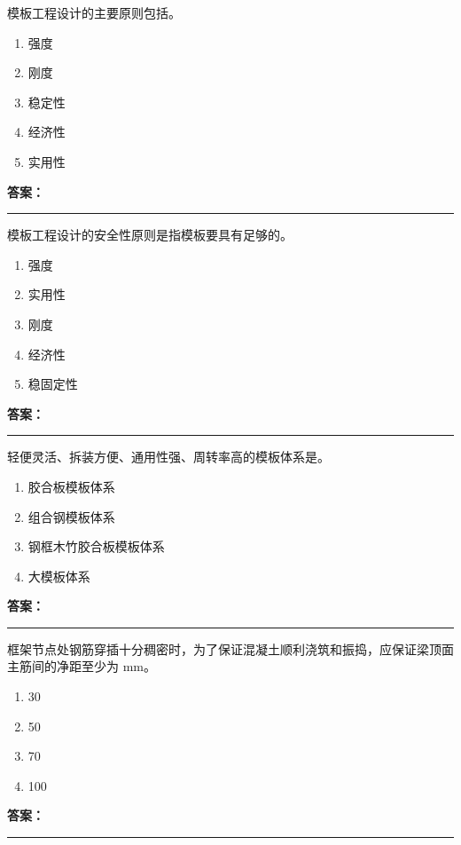 \documentclass[UTF8,fontset=fandol,11pt]{ctexart}
\newcommand{\answerline}{\textcolor{answerred}{\rule{2.4cm}{0.7pt}}}
\begin{document}
\vspace{0.2em}

\begin{quizbox}[title={第 22 题}]
模板工程设计的主要原则包括。\\
\begin{enumerate}[label=\Alph*.]
\item 强度
\item 刚度
\item 稳定性
\item 经济性
\item 实用性
\end{enumerate}
\textbf{\textcolor{answerred}{答案：}} \answerline
\end{quizbox}

\vspace{0.2em}

\begin{quizbox}[title={第 23 题}]
模板工程设计的安全性原则是指模板要具有足够的。\\
\begin{enumerate}[label=\Alph*.]
\item 强度
\item 实用性
\item 刚度
\item 经济性
\item 稳固定性
\end{enumerate}
\textbf{\textcolor{answerred}{答案：}} \answerline
\end{quizbox}

\vspace{0.2em}

\begin{quizbox}[title={第 24 题}]
轻便灵活、拆装方便、通用性强、周转率高的模板体系是。\\
\begin{enumerate}[label=\Alph*.]
\item 胶合板模板体系
\item 组合钢模板体系
\item 钢框木竹胶合板模板体系
\item 大模板体系
\end{enumerate}
\textbf{\textcolor{answerred}{答案：}} \answerline
\end{quizbox}

\vspace{0.2em}

\begin{quizbox}[title={第 25 题}]
框架节点处钢筋穿插十分稠密时，为了保证混凝土顺利浇筑和振捣，应保证梁顶面主筋间的净距至少为 mm。\\
\begin{enumerate}[label=\Alph*.]
\item 30
\item 50
\item 70
\item 100
\end{enumerate}
\textbf{\textcolor{answerred}{答案：}} \answerline
\end{quizbox}
\end{document}
